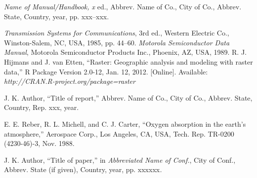 \documentclass[correspondence]{IEEEtaes}
\begin{document}
\vspace*{-12pt}
\begin{thebibliography}{[34A]}
\item[]  \emph{Name of Manual/Handbook, x} ed., Abbrev. Name of Co., City of Co., Abbrev. State, Country, year, pp. xxx--xxx.
\end{thebibliography}

\vspace*{-12pt}
\begin{thebibliography}{[31d]}
\setcounter{enumiv}{9}
\emph{Transmission Systems for Communications}, 3rd ed., Western Electric Co., Winston-Salem, NC, USA, 1985, pp. 44--60.
\emph{Motorola Semiconductor Data Manual}, Motorola Semiconductor Products Inc., Phoenix, AZ, USA, 1989.
R. J. Hijmans and J. van Etten, ``Raster: Geographic analysis and modeling with raster data,'' R Package Version 2.0-12, Jan. 12, 2012. {[}Online{]}. Available: \emph{http://CRAN.R-project.org/package=raster}
\end{thebibliography}

\vspace*{-12pt}

\begin{thebibliography}{[31d]}
\item[]  J. K. Author, ``Title of report,'' Abbrev. Name of Co., City of Co., Abbrev. State, Country, Rep. xxx, year.
\end{thebibliography}

\vspace*{-12pt}
\begin{thebibliography}{[31d]}
\setcounter{enumiv}{12}
E. E. Reber, R. L. Michell, and C. J. Carter, ``Oxygen absorption in the earth's atmosphere,'' Aerospace Corp., Los Angeles, CA, USA, Tech. Rep. TR-0200 (4230-46)-3, Nov. 1988.
\end{thebibliography}

\vspace*{-12pt}
\begin{thebibliography}{[31d]}
\item[] J. K. Author, ``Title of paper,'' in \emph{Abbreviated Name of Conf.}, City of Conf., Abbrev. State (if given), Country, year, pp. xxxxxx\emph{.}
\end{thebibliography}
\end{document}
